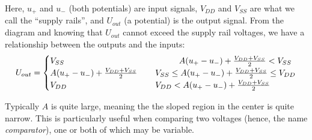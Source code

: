 Here, $u_+$ and $u_-$ (both potentials) are input signals, $V_{DD}$ and $V_{SS}$ are what we call the ``supply rails'', and $U_{out}$ (a potential) is the output signal. From the diagram and knowing that $U_{out}$ cannot exceed the supply rail voltages, we have a relationship between the outputs and the inputs:
\begin{equation*}
U_{out} =
\begin{cases} 
V_{SS} &  
\hspace{1.4cm}A(u_+ - u_-) + \frac{V_{DD} +V_{SS} }{2} < V_{SS} \\
A(u_+ - u_-) + \frac{V_{DD} +V_{SS} }{2} & 
\hspace{0.4cm}V_{SS}\leq A(u_+ - u_-) + \frac{V_{DD} +V_{SS} }{2} \leq V_{DD} \\
V_{DD} &  
\hspace{0.4cm}V_{DD}<A(u_+ - u_-) + \frac{V_{DD} +V_{SS} }{2} \\
\end{cases}
\end{equation*}

\begin{center}
\end{center}

Typically $A$ is quite large, meaning the the sloped region in the center is quite narrow. This is particularly useful when comparing two voltages (hence, the name \textit{comparator}), one or both of which may be variable.
\empt{\newpage}